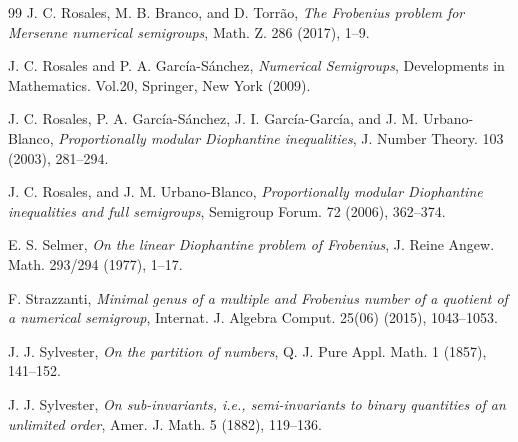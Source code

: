 \documentclass[reqno, 12pt]{article}
\numberwithin{equation}{section}
\theoremstyle{definition}
\begin{document}
\begin{thebibliography}{99}
 J. C. Rosales, M. B. Branco, and D. Torr\~ao, \emph{The Frobenius problem for Mersenne numerical semigroups},  Math. Z. 286 (2017), 1--9.

 J. C. Rosales and P. A. Garc\'ia-S\'anchez, \emph{Numerical Semigroups}, Developments in Mathematics. Vol.20, Springer, New York (2009).

 J. C. Rosales, P. A. Garc\'ia-S\'anchez, J. I. Garc\'ia-Garc\'ia, and J. M. Urbano-Blanco, \emph{Proportionally modular Diophantine inequalities}, J. Number Theory. 103 (2003), 281--294.

 J. C. Rosales, and J. M. Urbano-Blanco, \emph{Proportionally modular Diophantine inequalities and full semigroups}, Semigroup Forum. 72 (2006), 362--374.

 E. S. Selmer, \emph{On the linear Diophantine problem of Frobenius}, J. Reine Angew. Math. 293/294 (1977), 1--17.

 F. Strazzanti, \emph{Minimal genus of a multiple and Frobenius number of a quotient of a numerical semigroup}, Internat. J. Algebra Comput. 25(06) (2015), 1043--1053.

 J. J. Sylvester, \emph{On the partition of numbers}, Q. J. Pure Appl. Math. 1 (1857), 141--152.

 J. J. Sylvester, \emph{On sub-invariants, i.e., semi-invariants to binary quantities of an unlimited order}, Amer. J. Math. 5 (1882), 119--136.

\end{thebibliography}
\end{document}
